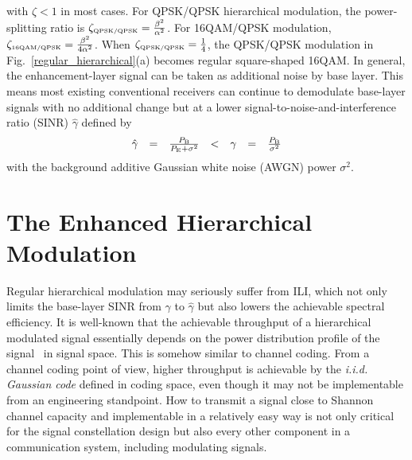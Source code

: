 \documentclass[conference]{IEEEtran}
\begin{document}
\noindent with $\zeta < 1$ in most cases. For QPSK/QPSK
hierarchical modulation, the power-splitting ratio is
$\zeta_{\mbox{\tiny QPSK/QPSK}}= \frac{\beta^{2}}{\alpha^2}$. For
16QAM/QPSK modulation, $\zeta_{\mbox{\tiny 16QAM/QPSK}}=
\frac{\beta^{2}}{4\alpha^2}$. When $\zeta_{\mbox{\tiny
QPSK/QPSK}}=\frac{1}{4}$, the QPSK/QPSK modulation in
Fig.~\ref{regular_hierarchical}(a) becomes regular square-shaped
16QAM. In general, the enhancement-layer signal can be taken as
additional noise by base layer. This means most existing
conventional receivers can continue to demodulate base-layer
signals with no additional change but at a lower
signal-to-noise-and-interference ratio (SINR) $\hat{\gamma}$
defined by
\begin{equation}
\begin{array}{rcccccl}
\hat{\gamma}& = & \frac{P_{\rm B}}{P_{\rm
E}+\sigma^2}&<&\gamma&=&\frac{P_{\rm B}}{\sigma^2}
\end{array}\label{SINR}
\end{equation}
\noindent with the background additive Gaussian white noise (AWGN)
power $\sigma^2$.

\section{The Enhanced Hierarchical Modulation}
Regular hierarchical modulation may seriously suffer from ILI,
which not only limits the base-layer SINR from ${\gamma}$ to
$\hat{\gamma}$ but also lowers the achievable spectral efficiency.
It is well-known that the achievable throughput of a hierarchical
modulated signal essentially depends on the power distribution
profile of the signal~\cite{Unge82} in signal space. This is
somehow similar to channel coding. From a channel coding point of
view, higher throughput is achievable by the {\em i.i.d. Gaussian
code} defined in coding space, even though it may not be
implementable from an engineering standpoint. How to transmit a
signal close to Shannon channel capacity and implementable in a
relatively easy way is not only critical for the signal
constellation design but also every other component in a
communication system, including modulating signals.
\end{document}
